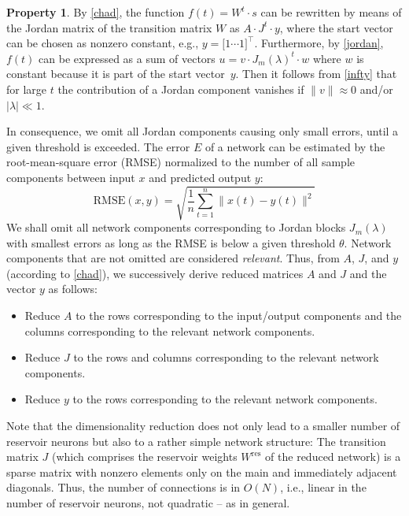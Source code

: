 \documentclass{sn-jnl}
\theoremstyle{definition}
\newtheorem{prop}{Property}
\begin{document}
\begin{prop}\label{relevan}
By \cref{chad}, the function $f(t) = W^t \cdot s$ can be rewritten by
means of the Jordan matrix of the transition matrix $W$ as $A \cdot J^t
\cdot y$, where the start vector can be chosen as nonzero constant, e.g., $y =
\big[ 1 \cdots 1 \big]^\top$. Furthermore, by \cref{jordan}, $f(t)$ can be
expressed as a sum of vectors $u = v \cdot J_m(\lambda)^t \cdot w$ where $w$ is
constant because it is part of the start vector~$y$. Then it follows from
\cref{infty} that for large $t$ the contribution of a Jordan component
vanishes if $\|v\| \approx 0$ and/or $|\lambda| \ll 1$.

In consequence, we omit all Jordan components causing only small errors, until a
given threshold is exceeded. The error $E$ of a network can be estimated by the
root-mean-square error (RMSE) normalized to the number of all sample components
between input $x$ and predicted output $y$:
  \[ \mathrm{RMSE}(x,y) = \sqrt{\frac{1}{n} \sum_{t=1}^n \big\|x(t)-y(t)\big\|^2} \]
We shall omit all network components corresponding to Jordan blocks
$J_m(\lambda)$ with smallest errors as long as the
RMSE is below a given threshold $\theta$. Network components that are not
omitted are considered \emph{relevant}. Thus, from $A$, $J$, and
$y$ (according to \cref{chad}), we successively derive reduced matrices
$A$ and $J$ and the vector $y$ as follows:
\begin{itemize}
  \item Reduce $A$ to the rows corresponding to the input/output components and
	the columns corresponding to the relevant network components.
  \item Reduce $J$ to the rows and columns corresponding to the relevant
	network components.
  \item Reduce $y$ to the rows corresponding to the relevant network components.
\end{itemize}
\end{prop}

Note that the dimensionality reduction does not only lead to a smaller number of
reservoir neurons but also to a rather simple network structure: The transition
matrix $J$ (which comprises the reservoir weights $W^\mathrm{res}$ of
the reduced network) is a sparse matrix with nonzero elements only on the main
and immediately adjacent diagonals. Thus, the number of connections is in
$O(N)$, i.e., linear in the number of reservoir neurons, not quadratic -- as in
general.
\end{document}
